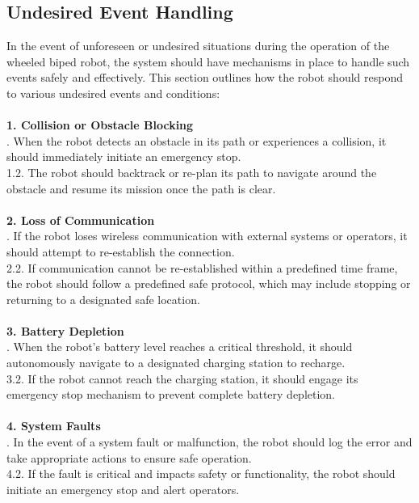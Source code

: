 \documentclass[12pt]{article}
\begin{document}
\subsection{Undesired Event Handling}
\noindent In the event of unforeseen or undesired situations during the operation of the wheeled biped robot, the system should have mechanisms in place to handle such events safely and effectively. This section outlines how the robot should respond to various undesired events and conditions:\\\\
\noindent\textbf{1. Collision or Obstacle Blocking}\\
. When the robot detects an obstacle in its path or experiences a collision, it should immediately initiate an emergency stop.\\
1.2. The robot should backtrack or re-plan its path to navigate around the obstacle and resume its mission once the path is clear.\\\\
\noindent\textbf{2. Loss of Communication}\\
. If the robot loses wireless communication with external systems or operators, it should attempt to re-establish the connection.\\
2.2. If communication cannot be re-established within a predefined time frame, the robot should follow a predefined safe protocol, which may include stopping or returning to a designated safe location.\\\\
\noindent\textbf{3. Battery Depletion}\\
. When the robot's battery level reaches a critical threshold, it should autonomously navigate to a designated charging station to recharge.\\
3.2. If the robot cannot reach the charging station, it should engage its emergency stop mechanism to prevent complete battery depletion.\\\\
\noindent\textbf{4. System Faults}\\
. In the event of a system fault or malfunction, the robot should log the error and take appropriate actions to ensure safe operation.\\
4.2. If the fault is critical and impacts safety or functionality, the robot should initiate an emergency stop and alert operators.\\\\
\end{document}
